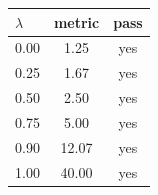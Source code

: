 \begin{center}
\begin{tabular}{@{}lcc@{}}
\toprule
$\lambda$ & metric & pass \\
\midrule
0.00 & 1.25 & yes \\
0.25 & 1.67 & yes \\
0.50 & 2.50 & yes \\
0.75 & 5.00 & yes \\
0.90 & 12.07 & yes \\
1.00 & 40.00 & yes \\
\bottomrule
\end{tabular}
\end{center}